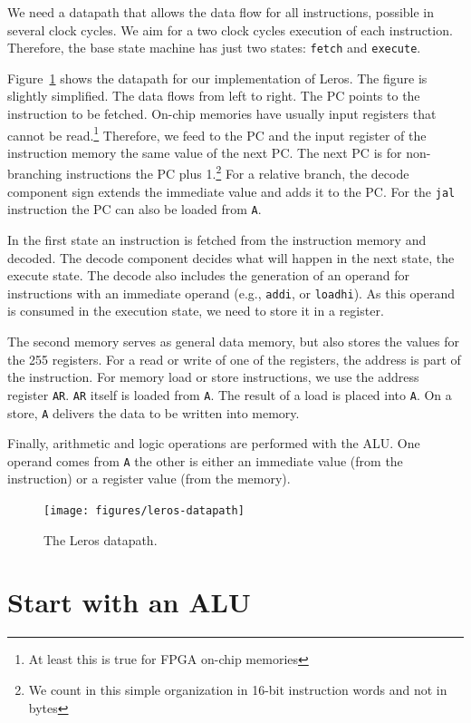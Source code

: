 \documentclass[%
    10pt,
    headinclude, footexclude,
    openright, %
    notitlepage,
    cleardoubleempty,
    headsepline,
    pointlessnumbers,
    bibtotoc, idxtotoc,
    ]{scrbook}
\newcommand{\code}[1]{{\small{\texttt{#1}}}}
\begin{document}
We need a datapath that allows the data flow for all instructions, possible in several
clock cycles. We aim for a two clock cycles execution of each instruction.
Therefore, the base state machine has just two states: \code{fetch} and \code{execute}.

Figure~\ref{fig:leros-datapath} shows the datapath for our implementation of Leros.
The figure is slightly simplified.
The data flows from left to right. The PC points to the instruction to be fetched.
On-chip memories have usually input registers that cannot be read.\footnote{At least
this is true for FPGA on-chip memories} Therefore, we feed to the PC and the input register
of the instruction memory the same value of the next PC. The next PC is for non-branching
instructions the PC plus 1.\footnote{We count in this simple organization in 16-bit instruction
words and not in bytes} For a relative branch, the decode component sign extends the immediate
value and adds it to the PC. For the \code{jal} instruction the PC can also be loaded from \code{A}.

In the first state an instruction is fetched from the instruction memory and decoded.
The decode component decides what will happen in the next state, the execute state.
The decode also includes the generation of an operand for instructions with an immediate operand
(e.g., \code{addi}, or \code{loadhi}). As this operand is consumed in the execution state,
we need to store it in a register.

The second memory serves as general data memory, but also stores the values for the
255 registers. For a read or write of one of the registers, the address is part of the instruction.
For memory load or store instructions, we use the address register \code{AR}.
\code{AR} itself is loaded from \code{A}. The result of a load is placed into \code{A}.
On a store, \code{A} delivers the data to be written into memory.

Finally, arithmetic and logic operations are performed with the ALU. One operand
comes from \code{A} the other is either an immediate value (from the instruction)
or a register value (from the memory).

\begin{figure}
  \centering
  \texttt{[image: figures/leros-datapath]}
  \caption{The Leros datapath.}
  \label{fig:leros-datapath}
\end{figure}

\section{Start with an ALU}
\end{document}
